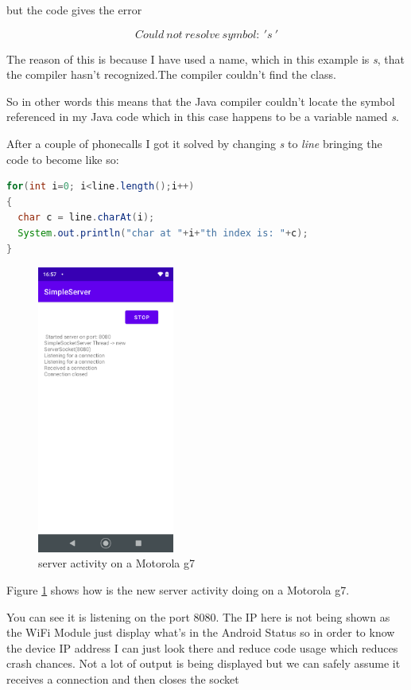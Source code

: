 \documentclass[a4paper,12pt]{book}
\begin{document}
but the code gives the error

\[ Could \ not \ resolve \ symbol: \ 's\ ' \]


\newline The reason of this is because I have used a name, which in this example is \emph{s}, that the compiler hasn't recognized.The compiler couldn't find the class.

So in other words this means that the Java compiler couldn't locate the symbol referenced in my Java code which in this case happens to be a variable named \emph{s}.

After a couple of phonecalls I got it solved by changing \emph{s} to \emph{line} bringing the code to become like so:

\begin{lstlisting}[language=java]
for(int i=0; i<line.length();i++)
{
  char c = line.charAt(i);
  System.out.println("char at "+i+"th index is: "+c);
}
\end{lstlisting}

\clearpage


\begin{figure}
\centering
\includegraphics[width=4.5cm]{./9-May/server_g7.PNG}
\caption{server activity on a Motorola g7}\label{fig:server-activity-g7}
\end{figure}
Figure \ref{fig:server-activity-g7} shows how is the new server activity doing on a Motorola g7.

You can see it is listening on the port 8080. The IP here is not being shown as the WiFi Module just display what's in the Android Status so in order to know the device IP address I can just look there and reduce code usage which reduces crash chances. Not a lot of output is being displayed but we can safely assume it receives a connection and then closes the socket
\end{document}
